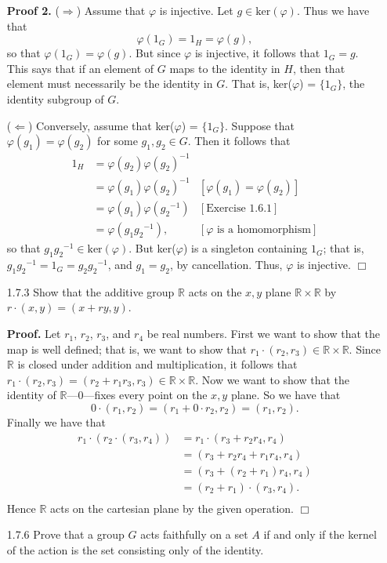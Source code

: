 \documentclass[9pt]{article}
\newcommand{\qed}{\hfill \ensuremath{\Box}}
\newcommand{\R}{\mathbb{R}}
\begin{document}
\begin{enumerate}
      \textbf{Proof 2.} ($\Rightarrow$) Assume that $\varphi$ is injective. Let
      $g \in \text{ker}(\varphi)$. Thus we have that
      $$\varphi(1_G) = 1_H = \varphi(g),$$
      so that $\varphi(1_G) = \varphi(g)$. But since $\varphi$ is injective, it
      follows that $1_G = g$. This says that if an element of $G$ maps to the
      identity in $H$, then that element must necessarily be the identity in
      $G$. That is, ker($\varphi$) = $\{1_G\}$, the identity subgroup of $G$.

      ($\Leftarrow$) Conversely, assume that ker($\varphi$) = $\{1_G\}$. Suppose that
      $\varphi(g_1) = \varphi(g_2)$ for some $g_1, g_2 \in G$. Then it follows
      that
      \begin{align*}
         1_H &= \varphi(g_2)\varphi(g_2)^{-1} \\
             &= \varphi(g_1)\varphi(g_2)^{-1} &[\varphi(g_1) = \varphi(g_2)] \\
             &= \varphi(g_1)\varphi({g_2}^{-1}) &[\text{Exercise }1.6.1] \\
             &= \varphi(g_1{g_2}^{-1}), &[\varphi \text{ is a homomorphism}]
      \end{align*}
      so that $g_1{g_2}^{-1} \in \text{ker}(\varphi)$. But ker($\varphi$) is a
      singleton containing $1_G$; that is,
      $g_1{g_2}^{-1} = 1_G = g_2{g_2}^{-1}$, and $g_1 = g_2$, by cancellation.
      Thus, $\varphi$ is injective. \qed
   \item[1.7.3]   Show that the additive group $\R$ acts on the $x, y$ plane
                  $\R \times \R$ by $r \cdot (x, y) = (x + ry, y)$.

      \textbf{Proof.} Let $r_1$, $r_2$, $r_3$, and $r_4$ be real numbers. First
      we want to show that the map is well defined; that is, we want to show
      that $r_1 \cdot (r_2, r_3)  \in \R \times \R$. Since $\R$ is closed under
      addition and multiplication, it follows that
      $r_1 \cdot (r_2, r_3) = (r_2 + r_1r_3, r_3) \in \R \times \R$. Now we
      want to show that the identity of $\R$---0---fixes every point on the
      $x, y$ plane. So we have that
      $$0 \cdot (r_1, r_2) = (r_1 + 0 \cdot r_2, r_2) = (r_1, r_2).$$
      Finally we have that
      \begin{align*}
         r_1 \cdot (r_2 \cdot (r_3, r_4)) &= r_1 \cdot (r_3 + r_2r_4, r_4) \\
            &= (r_3 + r_2r_4 + r_1r_4, r_4) \\
            &= (r_3 + (r_2 + r_1)r_4, r_4) \\
            &= (r_2 + r_1) \cdot (r_3, r_4). \\
      \end{align*}
      Hence $\R$ acts on the cartesian plane by the given operation. \qed
   \item[1.7.6]   Prove that a group $G$ acts faithfully on a set $A$ if and
                  only if the kernel of the action is the set consisting only of
                  the identity.


\end{enumerate}
\end{document}
